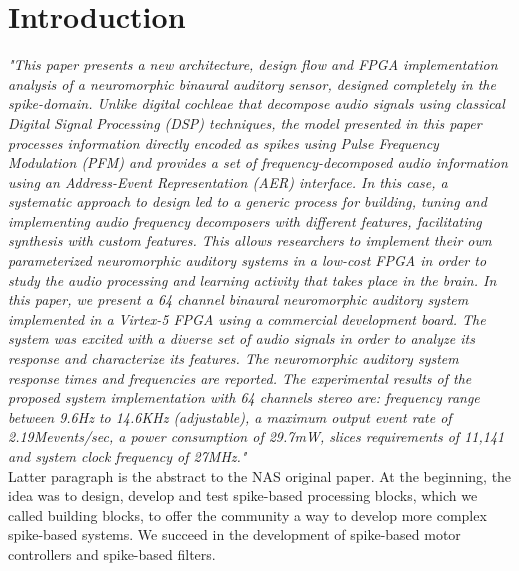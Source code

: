 \tableofcontents
\newpage
\listoffigures
\newpage

\section{Introduction}
\label{sec:Introduction}
\textit{"This paper presents a new architecture, design flow and FPGA implementation analysis of a neuromorphic binaural auditory sensor, designed completely in the spike-domain. Unlike digital cochleae that decompose audio signals using classical Digital Signal Processing (DSP) techniques, the model presented in this paper processes information directly encoded as spikes using Pulse Frequency Modulation (PFM) and provides a set of frequency-decomposed audio information using an Address-Event Representation (AER) interface. In this case, a systematic approach to design led to a generic process for building, tuning and implementing audio frequency decomposers with different features, facilitating synthesis with custom features. This allows researchers to implement their own parameterized neuromorphic auditory systems in a low-cost FPGA in order to study the audio processing and learning activity that takes place in the brain. In this paper, we present a 64 channel binaural neuromorphic auditory system implemented in a Virtex-5 FPGA using a commercial development board. The system was excited with a diverse set of audio signals in order to analyze its response and characterize its features. The neuromorphic auditory system response times and frequencies are reported. The experimental results of the proposed system implementation with 64 channels stereo are: frequency range between 9.6Hz to 14.6KHz (adjustable), a maximum output event rate of 2.19Mevents/sec, a power consumption of 29.7mW, slices requirements of 11,141 and system clock frequency of 27MHz."} 
\\

Latter paragraph is the abstract to the NAS \cite{jimenez2017binaural} original paper. At the beginning, the idea was to design, develop and test spike-based processing blocks, which we called building blocks, to offer the community a way to develop more complex spike-based systems. We succeed in the development of spike-based motor controllers and spike-based filters.

